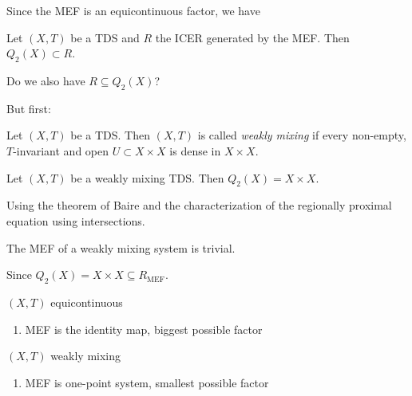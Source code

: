 \begin{frame}
  Since the MEF is an equicontinuous factor, we have
  \begin{corollary}
    Let $(X, T)$ be a TDS and $R$ the ICER generated by the MEF.
    Then $Q_2(X) \subset R$.
  \end{corollary}
  Do we also have $R \subseteq Q_2(X)$?
\end{frame}

\begin{frame}
  But first:
  \begin{definition}
    Let $(X,T)$ be a TDS. Then $(X,T)$ is called \emph{weakly mixing} if every non-empty, $T$-invariant and open $U\subset X \times X$ is dense in $X \times X$.
  \end{definition}
  \pause
  \begin{proposition}
    Let $(X,T)$ be a weakly mixing TDS. Then $Q_2(X) = X \times X$.
  \end{proposition}
  Using the theorem of Baire and the characterization of the
  regionally proximal equation using intersections.
  \pause
  \begin{corollary}
    The MEF of a weakly mixing system is trivial.
  \end{corollary}
  Since $Q_2(X) = X \times X \subseteq R_\text{MEF}$.
\end{frame}

\begin{frame}
  \begin{minipage}{0.45\textwidth}
    \begin{center}
      $(X, T)$ equicontinuous
      \vspace{2em}
      \begin{enumerate}
        \item MEF is the identity map, biggest possible factor
      \end{enumerate}
    \end{center}
  \end{minipage}%
  \begin{minipage}{0.45\textwidth}
    \begin{center}
      $(X, T)$ weakly mixing
      \vspace{2em}
      \begin{enumerate}
        \item MEF is one-point system, smallest possible factor
      \end{enumerate}
    \end{center}
  \end{minipage}
\end{frame}

